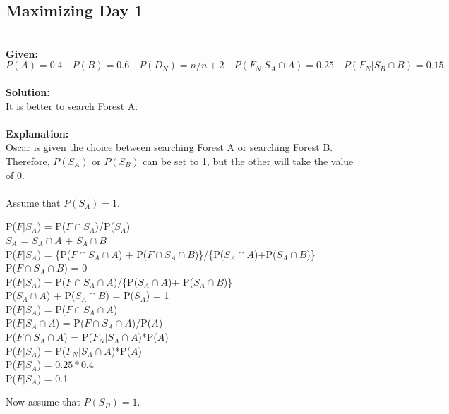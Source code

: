 \subsection{Maximizing Day 1}
 \\
{\bf Given:}\\    
    $ P(A) = 0.4 \quad P(B) = 0.6 \quad P(D_N) = n/n+2 \quad P(F_{N}|S_A \cap A) = 0.25 \quad P(F_{N}|S_B \cap B) = 0.15 $\\ \\
{\bf Solution:}\\
    {\color{blue}It is better to search Forest A.}\\ \\
{\bf Explanation:}\\
    Oscar is given the choice between searching Forest A or searching Forest B. Therefore, $P(S_A)$ or $P(S_B)$ can be set to 1, but the other will take the value of 0. \\\\
    Assume that $P(S_A) = 1$. \\
    \begin{center}
        P($F|S_A$) = P($F \cap S_A$)\slash P($S_A$) \\
        $S_A$ = $S_A \cap A$ + $S_A \cap B$ \\
        P($F|S_{A}$) = \{P($F \cap S_{A}\cap A$) + P($F \cap S_{A}\cap B$)\}\slash \{P($S_A \cap A$)+P($S_A \cap B$)\} \\
        P($F \cap S_{A}\cap B$) = 0 \\
        P($F|S_{A}$) = {P($F \cap S_{A}\cap A$)}\slash\{P($S_{A} \cap A$)+ P($S_{A}\cap B$)\} \\
        P($S_A \cap A$) + P($S_A \cap B$) = P($S_A$) = 1 \\
        P($F|S_{A}$) = P($F \cap S_A \cap A$) \\
        P($F|S_A \cap A$) = P($F \cap S_A \cap A$)\slash P($A$) \\
        P($F \cap S_A \cap A$) =  P($F_N|S_A \cap A$)*P($A$) \\ 
        P($F|S_{A}$) = P($F_N|S_A \cap A$)*P($A$) \\
        P($F|S_{A}$) = $0.25*0.4$ \\
        P($F|S_{A}$) = 0.1 \\
    \end{center}
    Now assume that $P(S_B) = 1$. \\
